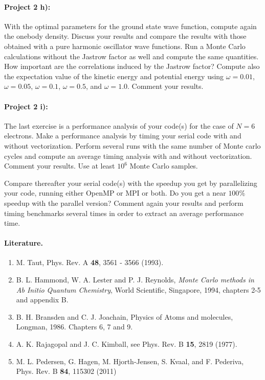 \documentclass[%
oneside,                 %
final,                   %
10pt]{article}
\begin{document}
\paragraph{Project 2 h):}
With the optimal parameters for the ground state wave function, compute again the onebody density. Discuss your results and compare the results with those obtained with a pure harmonic oscillator
wave functions. Run a Monte Carlo calculations without the Jastrow factor as well
and compute the same quantities. How important are the correlations induced by the Jastrow factor?
Compute also the expectation value of the kinetic energy and potential energy using $\omega=0.01$,
$\omega=0.05$, $\omega=0.1$, $\omega=0.5$, and $\omega=1.0$. Comment your results.

\paragraph{Project 2 i):}
The last exercise  is a performance analysis of your code(s) for the case of $N=6$ electrons. Make a performance analysis by timing your serial code
with and without vectorization. Perform several runs with the same number of Monte carlo cycles and compute an average timing analysis
with and without vectorization. Comment your results. Use at least $10^6$ Monte Carlo samples. 

Compare thereafter your serial code(s)  with the speedup you get by parallelizing your code, running either OpenMP or MPI or both.
Do you get a near $100\%$ speedup with the parallel version? Comment again your results and perform timing benchmarks several times in order 
to extract  an average performance time. 



\paragraph{Literature.}
\begin{enumerate}
\item M. Taut, Phys. Rev. A \textbf{48}, 3561 - 3566 (1993).

\item B. L. Hammond, W. A. Lester and P. J. Reynolds, \emph{Monte Carlo methods in Ab Initio Quantum Chemistry}, World Scientific, Singapore, 1994, chapters 2-5 and appendix B.

\item B. H. Bransden and C. J. Joachain, Physics of Atoms and molecules, Longman, 1986. Chapters 6, 7 and 9.

\item A. K.  Rajagopal and J. C. Kimball, see Phys. Rev. B \textbf{15}, 2819 (1977).

\item M. L. Pedersen, G. Hagen, M. Hjorth-Jensen, S. Kvaal,  and F. Pederiva, Phys. Rev. B \textbf{84}, 115302 (2011)
\end{enumerate}
\end{document}

